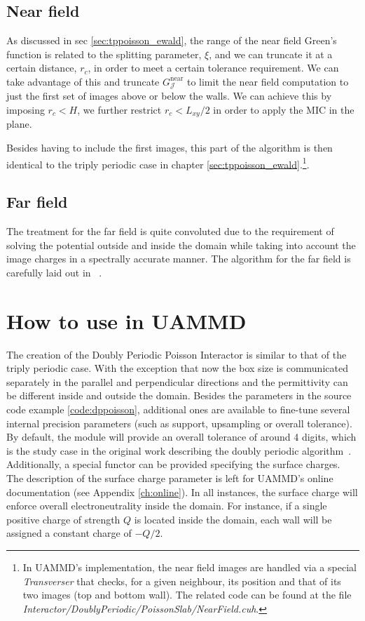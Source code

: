 \documentclass[ twoside,openright,titlepage,numbers=noenddot,%
headinclude,footinclude,cleardoublepage=empty,abstract=on,
BCOR=5mm,paper=b5,fontsize=11pt, dvipsnames
]{scrreprt}
\newcommand{\oper}[1]{\mathcal{#1}}
\newcommand{\uammd}{\gls{UAMMD}\xspace}
\newcommand{\near}{\textrm{near}}
\begin{document}
\subsection{Near field}
As discussed in sec \ref{sec:tppoisson_ewald}, the range of the near field Green's function is related to the splitting parameter, $\xi$, and we can truncate it at a certain distance, $r_{c}$, in order to meet a certain tolerance requirement. We can take advantage of this and truncate $G_{\oper{J}}^{\near}$ to limit the near field computation to just the first set of images above or below the walls. We can achieve this by imposing $r_c<H$, we further restrict $r_c < L_{xy}/2$ in order to apply the \gls{MIC} in the plane.

Besides having to include the first images, this part of the algorithm is then identical to the triply periodic case in chapter \ref{sec:tppoisson_ewald}.\footnote{In \uammd's implementation, the near field images are handled via a special \emph{Transverser} that checks, for a given neighbour, its position and that of its two images (top and bottom wall). The related code can be found at the file \emph{Interactor/DoublyPeriodic/PoissonSlab/NearField.cuh}.}.
\subsection{Far field}

The treatment for the far field is quite convoluted due to the requirement of solving the potential outside and inside the domain while taking into account the image charges in a spectrally accurate manner. The algorithm for the far field is carefully laid out in ~\cite{Maxian2021}.

\section{How to use in UAMMD}
The creation of the Doubly Periodic Poisson Interactor is similar to that of the triply periodic case. With the exception that now the box size is communicated separately in the parallel and perpendicular directions and the permittivity can be different inside and outside the domain. Besides the parameters in the source code example \ref{code:dppoisson}, additional ones are available to fine-tune several internal precision parameters (such as support, upsampling or overall tolerance). By default, the module will provide an overall tolerance of around 4 digits, which is the study case in the original work describing the doubly periodic algorithm~\cite{Maxian2021}. Additionally, a special functor can be provided specifying the surface charges. The description of the surface charge parameter is left for UAMMD's online documentation (see Appendix \ref{ch:online}).
In all instances, the surface charge will enforce overall electroneutrality inside the domain. For instance, if a single positive charge of strength $Q$ is located inside the domain, each wall will be assigned a constant charge of $-Q/2$.
\end{document}
